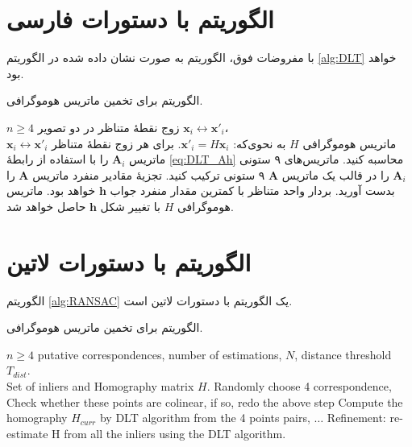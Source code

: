 \section{الگوریتم با دستورات فارسی}
با مفروضات فوق، الگوریتم  به صورت نشان داده شده در الگوریتم \eqref{alg:DLT}  خواهد بود.
\begin{algorithm}[ht]
\onehalfspacing
\caption{الگوریتم  برای تخمین ماتریس هوموگرافی.} \label{alg:DLT}
\begin{algorithmic}[1]
\REQUIRE $n\geq4$ زوج نقطهٔ متناظر در دو تصویر 
${\mathbf{x}_i\leftrightarrow\mathbf{x}'_i}$،\\
\ENSURE ماتریس هوموگرافی $H$ به نحوی‌که: 
$\mathbf{x}'_i = H \mathbf{x}_i$.
  \STATE برای هر زوج نقطهٔ متناظر
$\mathbf{x}_i\leftrightarrow\mathbf{x}'_i$ 
ماتریس $\mathbf{A}_i$ را با استفاده از رابطهٔ \ref{eq:DLT_Ah} محاسبه کنید.
  \STATE ماتریس‌های ۹ ستونی  $\mathbf{A}_i$ را در قالب یک ماتریس $\mathbf{A}$ ۹ ستونی ترکیب کنید. 
  \STATE تجزیهٔ مقادیر منفرد   ماتریس $\mathbf{A}$ را بدست آورید. بردار واحد متناظر با کمترین مقدار منفرد جواب $\mathbf{h}$ خواهد بود.
  \STATE  ماتریس هوموگرافی $H$ با تغییر شکل $\mathbf{h}$ حاصل خواهد شد.
\end{algorithmic}
\end{algorithm}

\section{الگوریتم با دستورات لاتین}
الگوریتم \ref{alg:RANSAC} یک الگوریتم با دستورات لاتین است.

\begin{algorithm}[ht]
\onehalfspacing
\caption{الگوریتم  برای تخمین ماتریس هوموگرافی.} \label{alg:RANSAC}
\begin{latin}
\begin{algorithmic}[1]
\REQUIRE $n\geq4$ putative correspondences, number of estimations, $N$, distance threshold $T_{dist}$.\\
\ENSURE Set of inliers and Homography matrix $H$.
  \STATE Randomly choose 4 correspondence,
  \STATE Check whether these points are colinear, if so, redo the above step
  \STATE Compute the homography $H_{curr}$ by DLT algorithm from the 4 points pairs,
  \STATE $\ldots$ %
  \ENDFOR
  \STATE Refinement: re-estimate H from all the inliers using the DLT algorithm.
\end{algorithmic}
\end{latin}
\end{algorithm}

